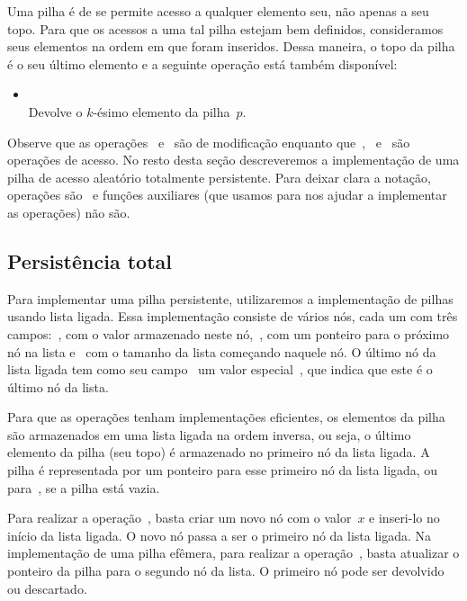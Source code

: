 \documentclass[main.tex]{subfiles}
\begin{document}
Uma pilha é de  se permite acesso a qualquer elemento seu, não apenas a seu topo. Para que os acessos a uma tal pilha estejam bem definidos, consideramos seus elementos na ordem em que foram inseridos. Dessa maneira, o topo da pilha é o seu último elemento e a seguinte operação está também disponível:

\begin{itemize}
	\item {}
		\\ Devolve o $k$-ésimo elemento da pilha~$p$.
\end{itemize}

Observe que as operações~ e~ são de modificação enquanto que~,~ e~ são operações de acesso. No resto desta seção descreveremos a implementação de uma pilha de acesso aleatório totalmente persistente. Para deixar clara a notação, operações são~ e funções auxiliares (que usamos para nos ajudar a implementar as operações) não são.

\subsection{Persistência total}

Para implementar uma pilha persistente, utilizaremos a implementação de pilhas usando lista ligada. Essa implementação consiste de vários nós, cada um com três campos:~, com o valor armazenado neste nó,~, com um ponteiro para o próximo nó na lista e~ com o tamanho da lista começando naquele nó. O último nó da lista ligada tem como seu campo~ um valor especial~, que indica que este é o último nó da lista.

Para que as operações tenham implementações eficientes, os elementos da pilha são armazenados em uma lista ligada na ordem inversa, ou seja, o último elemento da pilha (seu topo) é armazenado no primeiro nó da lista ligada. A pilha é representada por um ponteiro para esse primeiro nó da lista ligada, ou para~, se a pilha está vazia.

Para realizar a operação~, basta criar um novo nó com o valor~$x$ e inseri-lo no início da lista ligada. O novo nó passa a ser o primeiro nó da lista ligada. Na implementação de uma pilha efêmera, para realizar a operação~, basta atualizar o ponteiro da pilha para o segundo nó da lista. O primeiro nó pode ser devolvido ou descartado.
\end{document}
